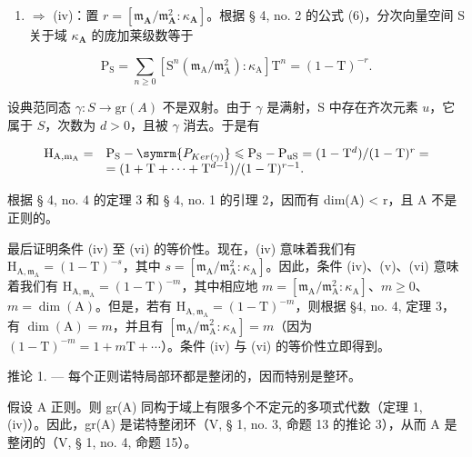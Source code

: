 \begin{enumerate}
\def\labelenumi{(\roman{enumi})}
\tightlist
\item
  \(\Rightarrow\) (iv)：置 \(r = [\mathfrak{m}_{\mathbf{A}} / \mathfrak{m}_{\mathbf{A}}^{2}:\kappa_{\mathbf{A}}]\)。根据 § 4, no. 2 的公式 (6)，分次向量空间 S 关于域 \(\kappa_{\mathbf{A}}\) 的庞加莱级数等于
\end{enumerate}

\[
\mathrm{P} _ {\mathrm{S}} = \sum_ {n \geqslant 0} \left[ \mathrm{S} ^ {n} (\mathfrak {m} _ {\mathrm{A}} / \mathfrak {m} _ {\mathrm{A}} ^ {2}): \kappa_ {\mathrm{A}} \right] \mathrm{T} ^ {n} = (1 - \mathrm{T}) ^ {- r}.
\]

设典范同态 \(\gamma: S \to \mathrm{gr}(A)\) 不是双射。由于 \(\gamma\) 是满射，S 中存在齐次元素 \(u\)，它属于 \(S\)，次数为 \(d > 0\)，且被 \(\gamma\) 消去。于是有

\[
\begin{array}{r l} \mathrm {H_ {A,m_ {A}}} = & \mathrm {P_ {S}} - \symrm {P_ {Ker(\gamma)}} \leqslant \mathrm {P_ {S}} - \mathrm {P_ {uS}} = (1 - \mathrm{T} ^ {d}) / (1 - \mathrm{T}) ^ {r} = \\ & = (1 + \mathrm{T} + \dots + \mathrm{T} ^ {d - 1}) / (1 - \mathrm{T}) ^ {r - 1}. \end{array}
\]

根据 § 4, no. 4 的定理 3 和 § 4, no. 1 的引理 2，因而有 dim(A) \textless{} r，且 A 不是正则的。

最后证明条件 (iv) 至 (vi) 的等价性。现在，(iv) 意味着我们有 \(\mathrm{H}_{\mathrm{A},\mathfrak{m}_{\mathrm{A}}}=(1-\mathrm{T})^{-s}\)，其中 \(s=[\mathfrak{m}_{\mathrm{A}}/\mathfrak{m}_{\mathrm{A}}^{2}:\kappa_{\mathrm{A}}]\)。因此，条件 (iv)、(v)、(vi) 意味着我们有 \(\mathrm{H}_{\mathrm{A},\mathfrak{m}_{\mathrm{A}}}=(1-\mathrm{T})^{-m}\)，其中相应地 \(m=[\mathfrak{m}_{\mathrm{A}}/\mathfrak{m}_{\mathrm{A}}^{2}:\kappa_{\mathrm{A}}]\)、\(m\geqslant0\)、\(m=\dim(\mathrm{A})\)。但是，若有 \(\mathrm{H}_{\mathrm{A},\mathfrak{m}_{\mathrm{A}}}=(1-\mathrm{T})^{-m}\)，则根据 §4, no. 4, 定理 3，有 \(\dim(\mathrm{A})=m\)，并且有 \([\mathfrak{m}_{\mathrm{A}}/\mathfrak{m}_{\mathrm{A}}^{2}:\kappa_{\mathrm{A}}]=m\)（因为 \((1-\mathrm{T})^{-m}=1+m\mathrm{T}+\cdots\)）。条件 (iv) 与 (vi) 的等价性立即得到。

推论 1. --- 每个正则诺特局部环都是整闭的，因而特别是整环。

假设 A 正则。则 gr(A) 同构于域上有限多个不定元的多项式代数（定理 1, (iv)）。因此，gr(A) 是诺特整闭环（V, § 1, no. 3, 命题 13 的推论 3），从而 A 是整闭的（V, § 1, no. 4, 命题 15）。


